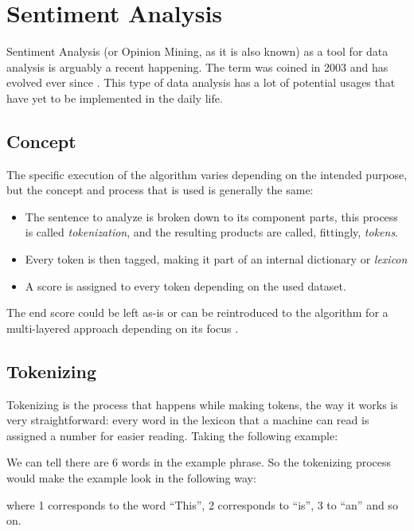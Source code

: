 \section{Sentiment Analysis}
Sentiment Analysis (or Opinion Mining, as it is also known) as a tool for data analysis is arguably a recent happening. The term was coined in 2003 and has evolved ever since \citep{rf3}.
This type of data analysis has a lot of potential usages that have yet to be implemented in the daily life.

\subsection{Concept}
The specific execution of the algorithm varies depending on the intended purpose, but the concept and process that is used is generally the same:
\begin{itemize}
	\item The sentence to analyze is broken down to its component parts, this process is called \textit{tokenization}, and the resulting products are called, fittingly, \textit{tokens}.
	\item Every token is then tagged, making it part of an internal dictionary or \textit{lexicon}
	\item A score is assigned to every token depending on the used dataset.
\end{itemize}
The end score could be left as-is or can be reintroduced to the algorithm for a multi-layered approach depending on its focus \citep{rf4}.

\subsection{Tokenizing}
Tokenizing is the process that happens while making tokens, the way it works is very straightforward: every word in the lexicon that a machine can read is assigned a number for easier reading. Taking the following example:
\begin{center}
\end{center}

We can tell there are 6 words in the example phrase. So the tokenizing process would make the example look in the following way:
\begin{center}
\end{center}

\noindent where 1 corresponds to the word ``This'', 2 corresponds to ``is'', 3 to ``an'' and so on.

